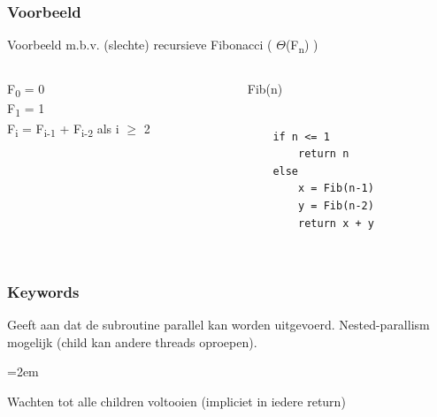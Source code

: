\documentclass
   [kulak] %
   {kulakbeamer}
\begin{document}
\begin{frame}[fragile]
	\frametitle{Voorbeeld}
	
	Voorbeeld m.b.v. (slechte) recursieve Fibonacci ( $\Theta$(F\textsubscript{n}) )
	
	
	
	\begin{columns}[T] %
		
		
		
		\begin{column}{.48\textwidth}
			\begin{minipage}[c][.6\textheight][c]{\linewidth}
				F\textsubscript{0} = 0 \\
				F\textsubscript{1} = 1 \\
				F\textsubscript{i} = F\textsubscript{i-1} + F\textsubscript{i-2} als i $\geqslant$ 2  
				
				
				
				
				
			\end{minipage}
		\end{column}
		
		
		
		\begin{column}{.48\textwidth}
	
	Fib(n)
	\begin{lstlisting}[style=CStyle]
	
	if n <= 1
		return n
	else 
		x = Fib(n-1)
		y = Fib(n-2)
		return x + y
	
	\end{lstlisting}
	
	\end{column}
	
	
	
	

	\end{columns}
	
\end{frame}



\begin{frame}
	\frametitle{Keywords}
	
	\begin{description}
		\pause
		
		
		\item[\textbf{spawn}] Geeft aan dat de subroutine parallel kan worden uitgevoerd. Nested-parallism mogelijk (child kan andere threads oproepen).
		
		\pause
		\itemsep=2em
		\item[\textbf{sync}] Wachten tot alle children voltooien (impliciet in iedere return)
		
		
		
		
		
	\end{description}
	
	
\end{frame}
\end{document}
